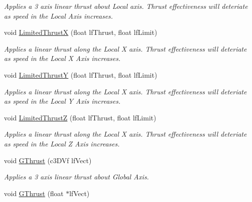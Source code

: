 \begin{DoxyCompactItemize}
\begin{DoxyCompactList}\small\item\em Applies a 3 axis linear thrust about Local axis. Thrust effectiveness will deteriate as speed in the Local Axis increases. \end{DoxyCompactList}\item 
\hypertarget{classc_momentum_a870fa47fea008f9d1cdb696b066b4b0b}{
void \hyperlink{classc_momentum_a870fa47fea008f9d1cdb696b066b4b0b}{LimitedThrustX} (float lfThrust, float lfLimit)}
\label{classc_momentum_a870fa47fea008f9d1cdb696b066b4b0b}

\begin{DoxyCompactList}\small\item\em Applies a linear thrust along the Local X axis. Thrust effectiveness will deteriate as speed in the Local X Axis increases. \end{DoxyCompactList}\item 
\hypertarget{classc_momentum_a82fc6e57d1256ed5c86512f84957ad68}{
void \hyperlink{classc_momentum_a82fc6e57d1256ed5c86512f84957ad68}{LimitedThrustY} (float lfThrust, float lfLimit)}
\label{classc_momentum_a82fc6e57d1256ed5c86512f84957ad68}

\begin{DoxyCompactList}\small\item\em Applies a linear thrust along the Local X axis. Thrust effectiveness will deteriate as speed in the Local Y Axis increases. \end{DoxyCompactList}\item 
\hypertarget{classc_momentum_a1d2f86f5d7319dd6b080adffff11b80d}{
void \hyperlink{classc_momentum_a1d2f86f5d7319dd6b080adffff11b80d}{LimitedThrustZ} (float lfThrust, float lfLimit)}
\label{classc_momentum_a1d2f86f5d7319dd6b080adffff11b80d}

\begin{DoxyCompactList}\small\item\em Applies a linear thrust along the Local X axis. Thrust effectiveness will deteriate as speed in the Local Z Axis increases. \end{DoxyCompactList}\item 
\hypertarget{classc_momentum_a6e230ba45811e244926ca5bd0917de81}{
void \hyperlink{classc_momentum_a6e230ba45811e244926ca5bd0917de81}{GThrust} (c3DVf lfVect)}
\label{classc_momentum_a6e230ba45811e244926ca5bd0917de81}

\begin{DoxyCompactList}\small\item\em Applies a 3 axis linear thrust about Global Axis. \end{DoxyCompactList}\item 
\hypertarget{classc_momentum_aac6e85ad29872d6452b739e528870732}{
void \hyperlink{classc_momentum_aac6e85ad29872d6452b739e528870732}{GThrust} (float $\ast$lfVect)}
\label{classc_momentum_aac6e85ad29872d6452b739e528870732}


\end{DoxyCompactItemize}

